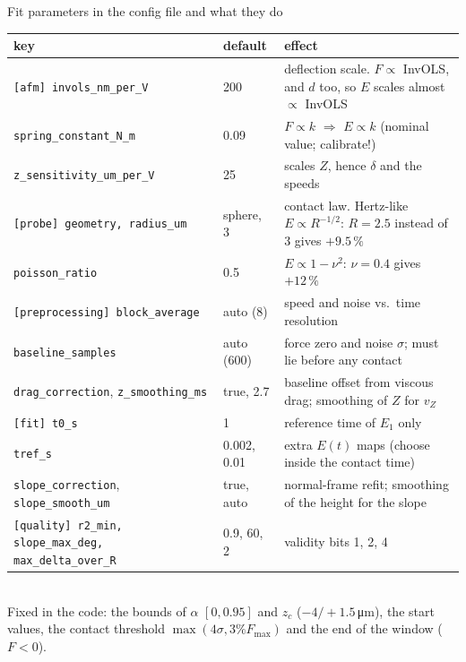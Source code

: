 \documentclass[aspectratio=169,9pt]{beamer}
\newcommand{\um}{\,\si{\micro\metre}}
\begin{document}
\begin{frame}{Fit parameters in the config file and what they do}
\scriptsize
\begin{tabularx}{\textwidth}{@{}l l X@{}}
\toprule
key & default & effect\\
\midrule
\texttt{[afm] invols\_nm\_per\_V} & 200 & deflection scale. $F\propto$ InvOLS, and $d$ too, so $E$ scales almost $\propto$ InvOLS\\
\texttt{spring\_constant\_N\_m} & 0.09 & $F\propto k$ $\Rightarrow$ $E\propto k$ (nominal value; calibrate!)\\
\texttt{z\_sensitivity\_um\_per\_V} & 25 & scales $Z$, hence $\delta$ and the speeds\\
\texttt{[probe] geometry, radius\_um} & sphere, 3 & contact law. Hertz-like $E\propto R^{-1/2}$: $R=2.5$ instead of 3 gives $+9.5\,\%$\\
\texttt{poisson\_ratio} & 0.5 & $E\propto1-\nu^2$: $\nu=0.4$ gives $+12\,\%$\\
\texttt{[preprocessing] block\_average} & auto (8) & speed and noise vs.\ time resolution\\
\texttt{baseline\_samples} & auto (600) & force zero and noise $\sigma$; must lie before any contact\\
\texttt{drag\_correction}, \texttt{z\_smoothing\_ms} & true, 2.7 & baseline offset from viscous drag; smoothing of $Z$ for $v_Z$\\
\texttt{[fit] t0\_s} & 1 & reference time of $E_1$ only\\
\texttt{tref\_s} & 0.002, 0.01 & extra $E(t)$ maps (choose inside the contact time)\\
\texttt{slope\_correction}, \texttt{slope\_smooth\_um} & true, auto & normal-frame refit; smoothing of the height for the slope\\
\texttt{[quality] r2\_min, slope\_max\_deg, max\_delta\_over\_R} & 0.9, 60, 2 & validity bits 1, 2, 4\\
\bottomrule
\end{tabularx}\\[4pt]
Fixed in the code: the bounds of $\alpha$ $[0,0.95]$ and $z_c$ ($-4/+1.5$\um), the start values, the contact threshold $\max(4\sigma,3\%F_\text{max})$ and the end of the window ($F<0$).
\end{frame}
\end{document}
